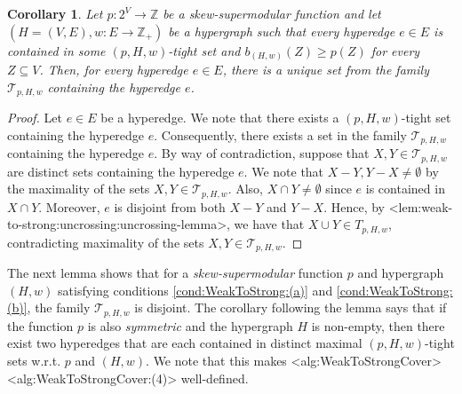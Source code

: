 \documentclass{article}
\def\Cref#1{<#1>}%
\newtheorem{corollary}{Corollary}[section]
\newtheorem{definition}{Definition}[section]
\newcommand{\maximalTightSetFamily}[1]{\ensuremath{\calT_{#1}}\xspace}
\newcommand{\tightSetFamily}[1]{\ensuremath{T_{#1}}\xspace}
\newcommand{\maximalTightSetContainingHyperedge}[1]{\ensuremath{\tau_{#1}}\xspace}
\providecommand{\Z}{\mathbb{Z}}
\providecommand{\calT}{\mathcal{T}}
\begin{document}
\begin{corollary}\label{cor:weak-to-strong:uncrossing:maximal-tight-set-containing-hyperedge-unique}
Let $p:2^V\rightarrow\Z$ be a skew-supermodular function and let $\left(H = (V, E), w:E \rightarrow\Z_+\right)$ be a hypergraph such that  
every hyperedge $e \in E$ is contained in some $(p, H, w)$-tight set
and $b_{(H,w)}(Z) \geq p(Z)$ for every $Z \subseteq V$. 
Then, for every hyperedge $e \in E$, there is a unique set from the family $\maximalTightSetFamily{p, H, w}$ containing the hyperedge $e$.
\end{corollary}
\begin{proof}
    Let $e \in E$ be a hyperedge. We note that there exists a $(p, H, w)$-tight set containing the hyperedge $e$. Consequently, there exists a set in the family \maximalTightSetFamily{p, H, w} containing the hyperedge $e$. By way of contradiction, suppose that $X, Y \in \maximalTightSetFamily{p, H, w}$ are distinct sets containing the hyperedge $e$. We note that $X - Y, Y - X \not = \emptyset$ by the maximality of the sets $X, Y \in \maximalTightSetFamily{p, H, w}$.
    Also, $X\cap Y\neq \emptyset$ since $e$ is contained in $X\cap Y$. Moreover, $e$ is disjoint from both $X-Y$ and $Y-X$. Hence, by \Cref{lem:weak-to-strong:uncrossing:uncrossing-lemma}, we have that $X\cup Y \in \tightSetFamily{p, H, w}$, contradicting maximality of the sets $X, Y \in \maximalTightSetFamily{p, H, w}$.
\end{proof}

The next lemma shows that for a \emph{skew-supermodular} function $p$ and hypergraph $(H, w)$ satisfying conditions  \ref{cond:WeakToStrong:(a)} and \ref{cond:WeakToStrong:(b)}, the family $\maximalTightSetFamily{p, H, w}$ is disjoint. The corollary following the lemma says that if the function $p$ is also \emph{symmetric} and the hypergraph $H$ is non-empty, then there exist two hyperedges that are each contained in distinct maximal $(p, H, w)$-tight sets w.r.t. $p$ and $(H, w)$.  We note that this makes \Cref{alg:WeakToStrongCover} \Cref{alg:WeakToStrongCover:(4)} well-defined.
\end{document}
